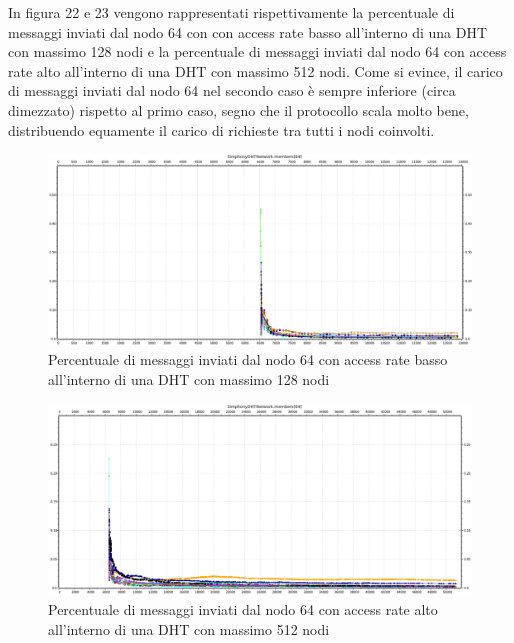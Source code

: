 \documentclass[	
	DIV=calc,
	paper=a4,
	fontsize=11pt,
	onecolumn
]{scrartcl} %
\begin{document}
	In figura 22 e 23 vengono rappresentati rispettivamente la percentuale di messaggi inviati dal nodo 64 con con access rate basso all'interno di una DHT con massimo 128 nodi e la percentuale di messaggi inviati dal nodo 64 con access rate alto all'interno di una DHT con massimo 512 nodi. Come si evince, il carico di messaggi inviati dal nodo 64 nel secondo caso è sempre inferiore (circa dimezzato) rispetto al primo caso, segno che il protocollo scala molto bene, distribuendo equamente il carico di richieste tra tutti i nodi coinvolti.
	
	\begin{figure}[H]
		\centering
		\includegraphics[scale=0.35]	{SymphonyDHT/plots/PercentageOfMessagesSent/128_Nodes_SlowAccess/SymphonyDHT_128Nodes_SlowAccess_Node64.png}
		\caption{Percentuale di messaggi inviati dal nodo 64 con access rate basso all'interno di una DHT con massimo 128 nodi}
		\label{Figura 22}
	\end{figure}
	\begin{figure}[H]
		\centering
		\includegraphics[scale=0.35]	{SymphonyDHT/plots/PercentageOfMessagesSent/512_Nodes_FastAccess/SymphonyDHT_512Nodes_FastAccess_Node64.png}
		\caption{Percentuale di messaggi inviati dal nodo 64 con access rate alto all'interno di una DHT con massimo 512 nodi}
		\label{Figura 23}
	\end{figure}	
	
\end{document}
